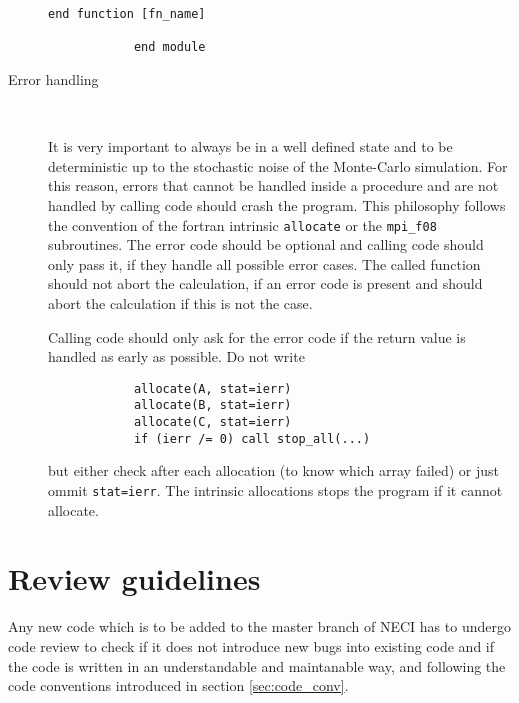 \documentclass[a4paper,notitlepage,dvipsnames]{scrreprt}
\newcommand\headitem[1]{\needspace{1.5\baselineskip}\item[{\boldmath #1 \nopagebreak}] \hfill \\ \nopagebreak}
\begin{document}
\begin{description}
\begin{lstlisting}[gobble=12]
            	end function [fn_name]

            end module
		\end{lstlisting}

    \headitem{Error handling}

        It is very important to always be in a well defined state and
            to be deterministic up to the stochastic noise of the Monte-Carlo simulation.
        For this reason, errors that cannot be handled inside a procedure and
            are not handled by calling code should crash the program.
        This philosophy follows the convention of the fortran intrinsic \lstinline{allocate}
            or the \lstinline{mpi_f08} subroutines.
        The error code should be optional and calling code should only pass it,
            if they handle all possible error cases.
        The called function should not abort the calculation, if an error code is present
            and should abort the calculation if this is not the case.

        Calling code should only ask for the error code if the return value is handled
            as early as possible.
        Do not write
        \begin{lstlisting}
            allocate(A, stat=ierr)
            allocate(B, stat=ierr)
            allocate(C, stat=ierr)
            if (ierr /= 0) call stop_all(...)
        \end{lstlisting}
        but either check after each allocation (to know which array failed) or just ommit \lstinline{stat=ierr}.
        The intrinsic allocations stops the program if it cannot allocate.


\end{description}

\section{Review guidelines}
Any new code which is to be added to the master branch of NECI has to undergo
code review to check if it does not introduce new bugs into existing code and
if the code is written in an understandable and maintanable way, and following
the code conventions introduced in section \ref{sec:code_conv}.
\end{document}
